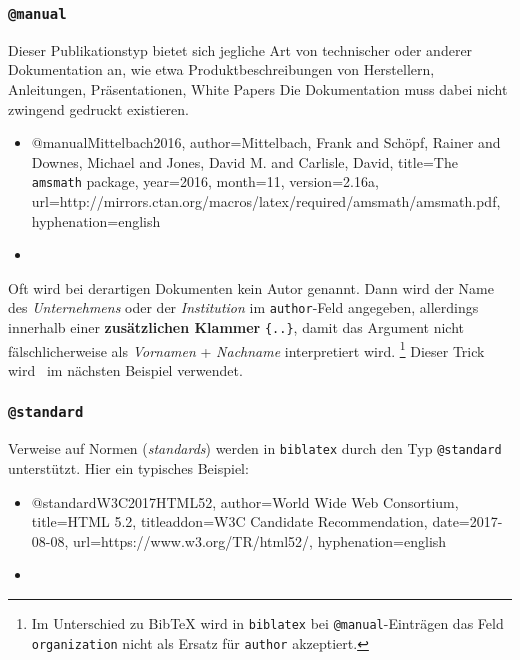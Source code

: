 
\subsubsection{\texttt{@manual}}
\label{sec:@manual}
Dieser Publikationstyp bietet sich jegliche Art von technischer oder anderer Dokumentation an, wie etwa Produktbeschreibungen von Herstellern, Anleitungen, Präsentationen, White Papers \usw Die Dokumentation muss dabei nicht zwingend gedruckt existieren.
%
\begin{itemize}
\item[]
\begin{GenericCode}[numbers=none]
@manual{Mittelbach2016,
  author={Mittelbach, Frank and Schöpf, Rainer and Downes, Michael and Jones, David M. and Carlisle, David},
  title={The \texttt{amsmath} package},
  year={2016},
  month={11},
  version={2.16a},
  url={http://mirrors.ctan.org/macros/latex/required/amsmath/amsmath.pdf},
  hyphenation={english}
}
\end{GenericCode}
\item[\cite{Mittelbach2016}] 
\end{itemize}
%
Oft wird bei derartigen Dokumenten kein Autor genannt. Dann wird der Name des \emph{Unternehmens} oder der \emph{Institution} im \texttt{author}-Feld angegeben, allerdings innerhalb einer \textbf{zusätzlichen Klammer} \texttt{\{..\}}, damit das Argument nicht fälschlicherweise als \emph{Vornamen} + \emph{Nachname} interpretiert wird.%
\footnote{Im Unterschied zu BibTeX wird in \texttt{biblatex} bei \texttt{@manual}-Einträgen das Feld \texttt{organization} nicht als Ersatz für \texttt{author} akzeptiert.}
Dieser Trick wird \ua\ im nächsten Beispiel verwendet.



\subsubsection{\texttt{@standard}}
\label{sec:@standard}


Verweise auf Normen (\emph{standards}) werden in \texttt{biblatex} durch den Typ \texttt{@standard}
unterstützt. Hier ein typisches Beispiel:
%
\begin{itemize}
\item[]
\begin{GenericCode}[numbers=none]
@standard{W3C2017HTML52,
  author={{World Wide Web Consortium}},
  title={HTML 5.2},
  titleaddon={W3C Candidate Recommendation},
	date={2017-08-08},
  url={https://www.w3.org/TR/html52/},
	hyphenation={english}
}
\end{GenericCode}
\item[\cite{W3C2017HTML52}] 
\end{itemize}
%



